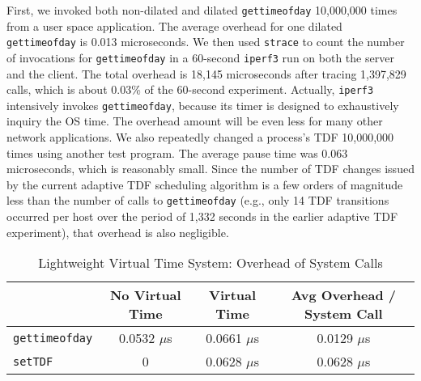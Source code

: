 First, we invoked both non-dilated and dilated \texttt{gettimeofday} 10,000,000 times from a user space application.
The average overhead for one dilated \texttt{gettimeofday} is 0.013 microseconds.
We then used \texttt{strace} to count the number of invocations for \texttt{gettimeofday} in a 60-second \texttt{iperf3} run on both the server and the client.
The total overhead is 18,145 microseconds after tracing 1,397,829 calls, which is about 0.03\% of the 60-second experiment. 
Actually, \texttt{iperf3} intensively invokes \texttt{gettimeofday},
because its timer is designed to exhaustively inquiry the OS time.
The overhead amount will be even less for many other network applications.
We also repeatedly changed a process's TDF 10,000,000 times using another test program.
The average pause time was 0.063 microseconds, which is reasonably small.
Since the number of TDF changes issued by the current adaptive TDF scheduling algorithm
is a few orders of magnitude less than the number of calls to \texttt{gettimeofday}
(e.g., only 14 TDF transitions occurred per host over the period of 1,332 seconds in the earlier adaptive TDF experiment), that overhead is also negligible.

\begin{table*}[t]
    \centering
    \caption{Lightweight Virtual Time System: Overhead of System Calls}
    \begin{tabular}{lccc}
        \hline
        \hline
        & No Virtual Time & Virtual Time & Avg Overhead / System Call \\%
        \hline
        \texttt{gettimeofday}  & 0.0532 $\mu$s & 0.0661 $\mu$s & 0.0129 $\mu$s\\%
        \texttt{setTDF} & 0  & 0.0628 $\mu$s & 0.0628 $\mu$s\\%
        \hline
    \end{tabular}
    \label{VT:Tab:Overhead}
\end{table*}


